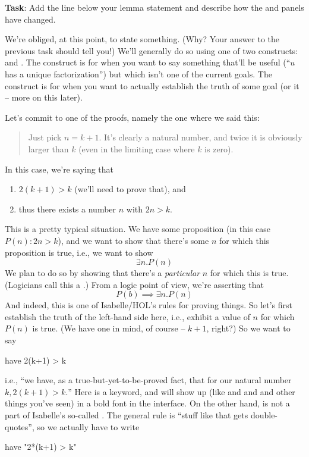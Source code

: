 \textbf{Task}: Add the line  below your lemma statement and describe how the  and  panels have changed. 

We're obliged, at this point, to state something. (Why? Your answer to the previous task should tell you!) We'll generally do so using one of two constructs:  and . The  construct is for when you want to say something that'll be useful (``$u$ has a unique factorization'') but which isn't one of the current goals. The  construct is for when you want to actually establish the truth of some goal (or  it -- more on this later). 

Let's commit to one of the proofs, namely the one where we said this:
\begin{quotation}
Just pick $n = k + 1$. It's clearly a natural number, and twice it is obviously larger than $k$ (even in the limiting case where $k$ is zero). 
\end{quotation}
In this case, we're saying that 

\begin{enumerate}
    \item $2(k+1) > k$ (we'll need to prove that), and 
    \item thus there exists a number $n$ with $2n > k$. 
\end{enumerate}
This is a pretty typical situation. We have some proposition (in this case $P(n): 2n > k$), and we want to show that there's some $n$ for which this proposition is true, i.e., we want to show
$$
\exists n . P(n)
$$
We plan to do so by showing that there's a \textit{particular} $n$ for which this is true. (Logicians call this a .) From a logic point of view, we're asserting that
$$
P(b) \implies \exists n . P(n)
$$
And indeed, this is one of Isabelle/HOL's rules for proving things. So let's first establish the truth of the left-hand side here, i.e., exhibit a value of $n$ for which $P(n)$ is true. (We have one in mind, of course -- $k+1$, right?) So we want to say

\begin{IS}
have 2(k+1) > k
\end{IS}
\noindent
i.e., ``we have, as a true-but-yet-to-be-proved fact, that for our natural number $k, 2(k+1) > k.$'' Here  is a keyword, and will show up (like  and  and  and other things you've seen) in a bold font in the interface. On the other hand,  is not a part of Isabelle's so-called . The general rule is ``stuff like that gets double-quotes'', so we actually have to write
\begin{IS}
have "2*(k+1) > k"    
\end{IS}

